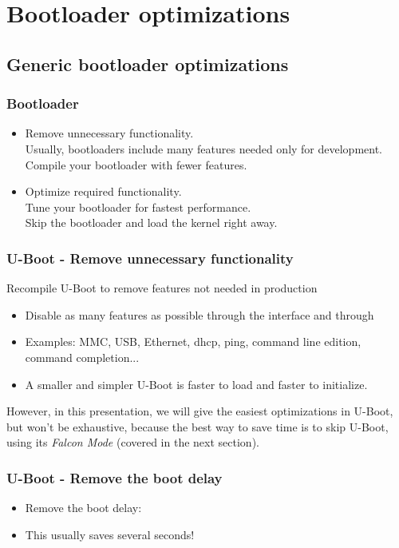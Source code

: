 \section{Bootloader optimizations}

\subsection{Generic bootloader optimizations}

\begin{frame}
\frametitle{Bootloader}
\begin{itemize}

\item Remove unnecessary functionality.\\
      Usually, bootloaders include many features needed only for
      development. Compile your bootloader with fewer features.
\item Optimize required functionality.\\
      Tune your bootloader for fastest performance. \\
      Skip the bootloader and load the kernel right away.
\end{itemize}
\end{frame}

\begin{frame}
\frametitle{U-Boot - Remove unnecessary functionality}
Recompile U-Boot to remove features not needed in production
\begin{itemize}
\item Disable as many features as possible through the 
      interface and through 
\item Examples: MMC, USB, Ethernet, dhcp, ping, command line edition,
      command completion...
\item A smaller and simpler U-Boot is faster to load and faster
      to initialize.
\end{itemize}
However, in this presentation, we will give the easiest optimizations in
U-Boot, but won't be exhaustive, because the best way to save time is to
skip U-Boot, using its {\em Falcon Mode} (covered in the next section).
\end{frame}

\begin{frame}
\frametitle{U-Boot - Remove the boot delay}
\begin{itemize}
\item Remove the boot delay:\\
\item This usually saves several seconds!
\end{itemize}
\end{frame}

